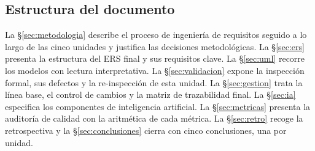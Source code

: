 \subsection{Estructura del documento}

La \S\ref{sec:metodologia} describe el proceso de ingeniería de requisitos seguido a lo largo de las
cinco unidades y justifica las decisiones metodológicas. La \S\ref{sec:ers} presenta la estructura
del ERS final y sus requisitos clave. La \S\ref{sec:uml} recorre los modelos con lectura
interpretativa. La \S\ref{sec:validacion} expone la inspección formal, sus defectos y la
re-inspección de esta unidad. La \S\ref{sec:gestion} trata la línea base, el control de cambios y la
matriz de trazabilidad final. La \S\ref{sec:ia} especifica los componentes de inteligencia
artificial. La \S\ref{sec:metricas} presenta la auditoría de calidad con la aritmética de cada
métrica. La \S\ref{sec:retro} recoge la retrospectiva y la \S\ref{sec:conclusiones} cierra con cinco
conclusiones, una por unidad.

